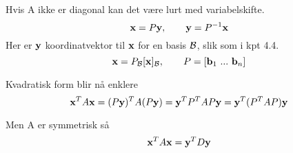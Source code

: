 Hvis A ikke er diagonal kan det være lurt med variabelskifte.
$$\mathbf{x} = P\mathbf{y}, \qquad \mathbf{y} = P^{-1} \mathbf{x}$$
Her er $\mathbf{y}$ koordinatvektor til $\mathbf{x}$ for en basis $\mathcal{B}$,
slik som i kpt 4.4.
$$\vecx = P_\B [\vecx]_\B, \qquad P = [\vecb_1 \ ...\  \vecb_n]$$

Kvadratisk form blir nå enklere
$$\mathbf{x}^T A \mathbf{x}
  = (P\mathbf{y})^T A (P\mathbf{y})
  = \mathbf{y}^TP^T A P\mathbf{y}
  = \mathbf{y}^T (P^T A P) \mathbf{y}$$

Men A er symmetrisk så
$$\mathbf{x}^T A \mathbf{x} = \mathbf{y}^T D \mathbf{y}$$
